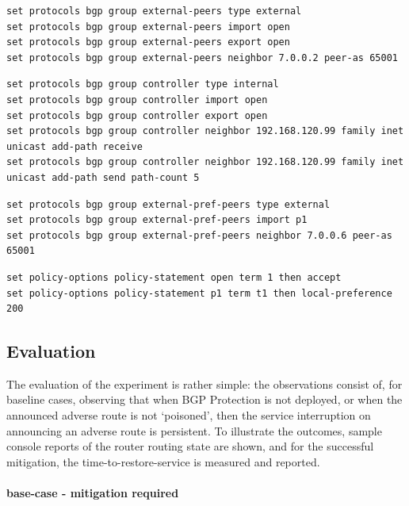 \begin{lstlisting}[title=default class for external peers]
set protocols bgp group external-peers type external
set protocols bgp group external-peers import open
set protocols bgp group external-peers export open
set protocols bgp group external-peers neighbor 7.0.0.2 peer-as 65001
\end{lstlisting}


\begin{lstlisting}[title=special group for the controller - note the add-path statements]
set protocols bgp group controller type internal
set protocols bgp group controller import open
set protocols bgp group controller export open
set protocols bgp group controller neighbor 192.168.120.99 family inet unicast add-path receive
set protocols bgp group controller neighbor 192.168.120.99 family inet unicast add-path send path-count 5
\end{lstlisting}


\begin{lstlisting}[title=special case external peers\, will get higher local pref and thus may disrupt connectivity]
set protocols bgp group external-pref-peers type external
set protocols bgp group external-pref-peers import p1
set protocols bgp group external-pref-peers neighbor 7.0.0.6 peer-as 65001
\end{lstlisting}


\begin{lstlisting}[title=policy definitions used in earlier clauses.]
set policy-options policy-statement open term 1 then accept
set policy-options policy-statement p1 term t1 then local-preference 200
\end{lstlisting}


\subsection{Evaluation}

The evaluation of the experiment is rather simple: the observations consist of, for baseline cases, observing that when BGP Protection is not deployed, or when the announced adverse route is not `poisoned', then the service interruption on announcing an adverse route is persistent.  To illustrate the outcomes, sample console reports of the router routing state are shown, and for the successful mitigation, the time-to-restore-service is measured and reported.

\paragraph{base-case - mitigation required}

